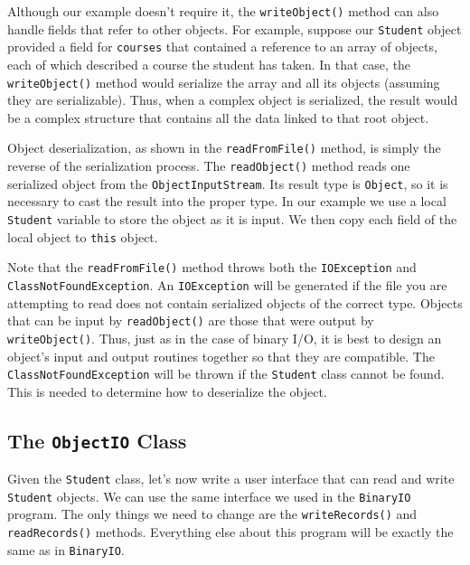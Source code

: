 Although our example doesn't require it, the {\tt writeObject()}
method can also handle fields that refer to other objects.  For
example, suppose our {\tt Student} object provided a field for
{\tt courses} that contained a reference to an array of objects, each of
which described a course the student has taken.  In that case, the
{\tt writeObject()} method would serialize the array and all its
objects (assuming they are serializable). Thus, when a complex
object is serialized, the result would be a complex structure that
contains all the data linked to that root object.

Object deserialization, as shown in the {\tt readFromFile()} method,
is simply the reverse of the serialization process.   The
{\tt readObject()} method reads one serialized object from the
{\tt ObjectInputStream}. Its result type is {\tt Object}, so it is
necessary to cast the result into the proper type.   In our example we
use a local {\tt Student} variable to store the object as it is
input.  We then copy each field of the local object to {\tt this}
object.

Note that the {\tt readFromFile()} method throws both the
{\tt IOException} and {\tt ClassNotFoundException}.  An {\tt IOException}
will be generated if the file you are attempting to read does not
contain serialized objects of the correct type.  Objects that can be
input by {\tt readObject()} are those that were output by
{\tt writeObject()}. Thus, just as in the case of binary I/O, it is best to
design an object's input and output routines together so that they are
compatible.  The {\tt ClassNotFoundException} will be thrown if the
{\tt Student} class cannot be found.  This is needed to determine how
to deserialize the object.


\subsection{The {\tt ObjectIO} Class}
\noindent Given the {\tt Student} class, let's now write a user interface that
can read and write {\tt Student} objects.   We can use the same
interface we used in the {\tt Binary\-IO} program.  The only things we
need to change are the {\tt write\-Records()} and {\tt readRecords()}
methods.  Everything else about this program will be exactly the same
as in {\tt BinaryIO}.


